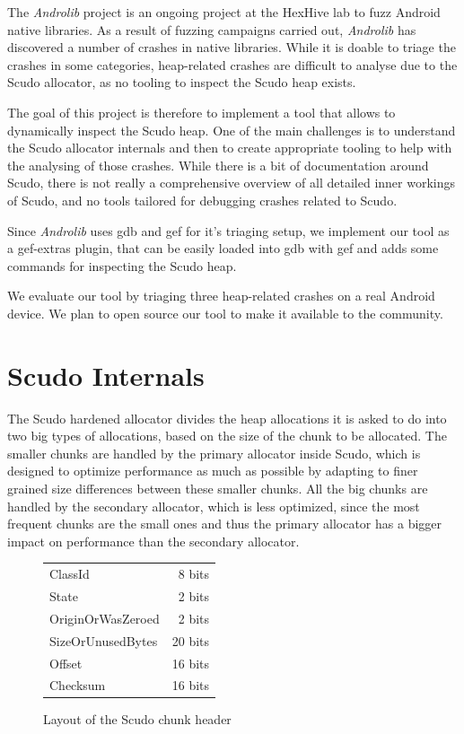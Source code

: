 \documentclass[a4paper,11pt,oneside]{report}
\begin{document}
The \textit{Androlib} project is an ongoing 
project at the HexHive lab to fuzz Android native libraries.
As a result of fuzzing campaigns carried out, \textit{Androlib} has discovered a 
number of crashes in native libraries.
While it is doable to triage the crashes in some categories, heap-related
crashes are difficult to analyse due to the Scudo allocator, as no tooling 
to inspect the Scudo heap exists.

The goal of this project is therefore to implement a tool that allows to dynamically 
inspect the Scudo heap. 
One of the main challenges is 
to understand the Scudo allocator internals and then to
create appropriate tooling to help with the analysing of those crashes.
While there is a bit of documentation around Scudo, there is not really a
comprehensive overview of all detailed inner workings of Scudo, and no 
tools tailored for debugging crashes related to Scudo.

Since \textit{Androlib} uses gdb and gef for it's triaging setup, we implement our tool as a gef-extras plugin, 
that can be easily loaded into gdb with gef and adds some commands for inspecting the
Scudo heap.
 
We evaluate our tool by triaging three heap-related crashes on a real Android 
device.
We plan to open source our tool to make it available to the community.

\chapter{Scudo Internals}

The Scudo hardened allocator divides the heap allocations it is asked to do into
two big types of allocations, based on the size of the chunk to be allocated.
The smaller chunks are handled by the primary allocator inside Scudo, which is
designed to optimize performance as much as possible by adapting to finer grained
size differences between these smaller chunks. All the big chunks are handled by
the secondary allocator, which is less optimized, since the most frequent chunks
are the small ones and thus the primary allocator has a bigger impact on performance
than the secondary allocator.

\begin{figure}[h!]
  \centering
  \begin{tabular}{lr}
    ClassId           & 8 bits  \\
    State             & 2 bits  \\
    OriginOrWasZeroed & 2 bits  \\
    SizeOrUnusedBytes & 20 bits \\
    Offset            & 16 bits \\
    Checksum          & 16 bits
  \end{tabular}
  \caption{Layout of the Scudo chunk header}
  \label{fig:ScudoChunkHeader}
\end{figure}
\end{document}
